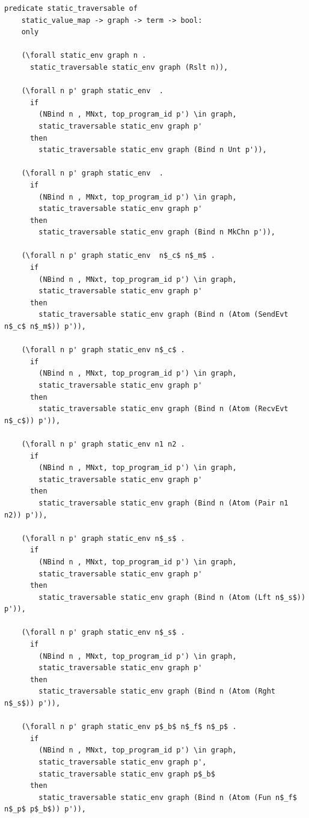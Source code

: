 \documentclass[10pt]{article}
\begin{document}
\begin{lstlisting}[language=logic, mathescape]
  predicate static_traversable of
    static_value_map -> graph -> term -> bool:
    only

    (\forall static_env graph n .
      static_traversable static_env graph (Rslt n)),

    (\forall n p' graph static_env  .
      if
        (NBind n , MNxt, top_program_id p') \in graph,
        static_traversable static_env graph p'
      then
        static_traversable static_env graph (Bind n Unt p')),

    (\forall n p' graph static_env  .
      if
        (NBind n , MNxt, top_program_id p') \in graph,
        static_traversable static_env graph p'
      then
        static_traversable static_env graph (Bind n MkChn p')),

    (\forall n p' graph static_env  n$_c$ n$_m$ .
      if
        (NBind n , MNxt, top_program_id p') \in graph, 
        static_traversable static_env graph p'
      then
        static_traversable static_env graph (Bind n (Atom (SendEvt n$_c$ n$_m$)) p')),

    (\forall n p' graph static_env n$_c$ .
      if
        (NBind n , MNxt, top_program_id p') \in graph,
        static_traversable static_env graph p'
      then
        static_traversable static_env graph (Bind n (Atom (RecvEvt n$_c$)) p')),

    (\forall n p' graph static_env n1 n2 .
      if
        (NBind n , MNxt, top_program_id p') \in graph,
        static_traversable static_env graph p'
      then
        static_traversable static_env graph (Bind n (Atom (Pair n1 n2)) p')),

    (\forall n p' graph static_env n$_s$ .
      if
        (NBind n , MNxt, top_program_id p') \in graph,
        static_traversable static_env graph p'
      then
        static_traversable static_env graph (Bind n (Atom (Lft n$_s$)) p')),

    (\forall n p' graph static_env n$_s$ .
      if
        (NBind n , MNxt, top_program_id p') \in graph,
        static_traversable static_env graph p'
      then
        static_traversable static_env graph (Bind n (Atom (Rght n$_s$)) p')),

    (\forall n p' graph static_env p$_b$ n$_f$ n$_p$ .
      if
        (NBind n , MNxt, top_program_id p') \in graph,
        static_traversable static_env graph p', 
        static_traversable static_env graph p$_b$
      then
        static_traversable static_env graph (Bind n (Atom (Fun n$_f$ n$_p$ p$_b$)) p')),


\end{lstlisting}
\end{document}
